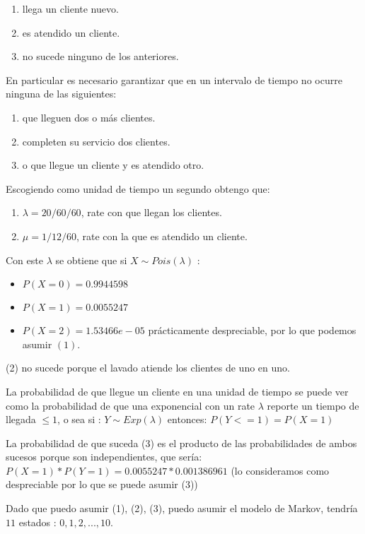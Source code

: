 \documentclass[14pt]{extarticle}
\begin{document}
\begin{enumerate}
    \item llega un cliente nuevo.
    \item es atendido un cliente.
    \item no sucede ninguno de los anteriores.
\end{enumerate}
	
En particular es necesario garantizar que en un intervalo de tiempo no ocurre ninguna de las siguientes:
\begin{enumerate}
    \item que lleguen dos o más clientes.
    \item completen su servicio dos clientes.
    \item o que llegue un cliente y es atendido otro.
\end{enumerate}

Escogiendo como unidad de tiempo un segundo obtengo que:
\begin{enumerate}
	\item $\lambda = 20 / 60 / 60$, rate con que llegan los clientes.
	\item $\mu = 1 / 12 / 60$, rate con la que es atendido un cliente.
\end{enumerate}
	
Con este $\lambda$ se obtiene que si $X \sim Pois(\lambda)$ :
\begin{itemize}
    \item $P( X = 0 )  = 0.9944598$
    \item $P( X = 1 )  = 0.0055247$
    \item $P( X = 2 )  = 1.53466e-05$ prácticamente despreciable, por lo que podemos asumir $(1)$.
\end{itemize}

(2) no sucede porque el lavado atiende los clientes de uno en uno.

La probabilidad de que llegue un cliente en una unidad de tiempo se puede ver como la probabilidad de que una exponencial con un rate $\lambda$ reporte un tiempo de llegada $ \leq 1$, o sea si : $Y \sim Exp(\lambda)$ entonces: $P( Y <= 1) = P( X = 1)$

La probabilidad de que suceda (3) es el producto de las probabilidades de ambos sucesos porque son independientes, que sería: $P( X = 1) * P( Y = 1) = 0.0055247 * 0.001386961$ (lo consideramos como despreciable por lo que se puede asumir (3))
	
Dado que puedo asumir (1), (2), (3), puedo asumir el modelo de Markov, tendría $11$ estados : ${0, 1, 2, ..., 10}$.
\end{document}
